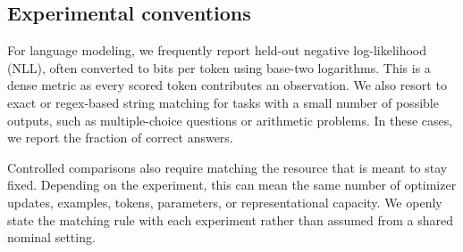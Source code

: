 \subsection{Experimental conventions}

For language modeling, we frequently report held-out negative log-likelihood (NLL), often converted to bits per token using base-two logarithms. This is a dense metric as every scored token contributes an observation. We also resort to exact or regex-based string matching for tasks with a small number of possible outputs, such as multiple-choice questions or arithmetic problems. In these cases, we report the fraction of correct answers.

Controlled comparisons also require matching the resource that is meant to stay fixed. Depending on the experiment, this can mean the same number of optimizer updates, examples, tokens, parameters, or representational capacity. We openly state the matching rule with each experiment rather than assumed from a shared nominal setting.
